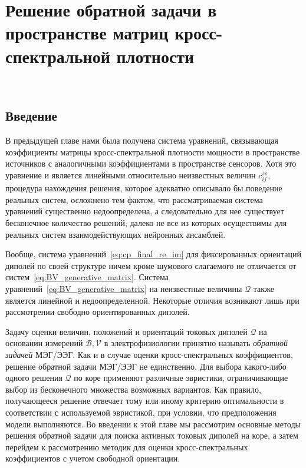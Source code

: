 \chapter{Решение обратной задачи в пространстве матриц кросс-спектральной плотности}~\label{chapt2}


\section{Введение}

В предыдущей главе нами была получена система уравнений, связывающая
коэффициенты матрицы кросс-спектральной плотности мощности в пространстве
источников с аналогичными коэффициентами в пространстве сенсоров. Хотя это
уравнение и является линейными относительно неизвестных величин $c_{ij}^{ss}$,
процедура нахождения решения, которое адекватно описывало бы поведение реальных
систем, осложнено тем фактом, что рассматриваемая система уравнений существенно
недоопределена, а следовательно для нее существует бесконечное количество
решений, далеко не все из которых осуществимы для реальных систем
взаимодействующих нейронных ансамблей.

Вообще, система уравнений~\ref{eq:cp_final_re_im} для фиксированных ориентаций
диполей по своей структуре ничем кроме шумового слагаемого не отличается от
систем~\ref{eq:BV_generative_matrix}.
Система уравнений~\ref{eq:BV_generative_matrix} на неизвестные величины $\mathcal{Q}$ также
является линейной и недоопределенной. Некоторые отличия возникают лишь при
рассмотрении свободно ориентированных диполей.

Задачу оценки величин, положений и ориентаций токовых диполей $\mathcal{Q}$ на
основании измерений $\mathcal{B}, \mathcal{V}$ в электрофизиологии принятно
называть \emph{обратной задачей} МЭГ/ЭЭГ.  Как и в случае оценки
кросс-спектральных коэффициентов, решение обратной задачи МЭГ/ЭЭГ не
единственно.  Для выбора какого-либо одного решения $\mathcal{Q}$ по коре
применяют различные эвристики, ограничивающие выбор из бесконечного множества
возможных вариантов.  Как правило, получающееся решение отвечает тому или иному
критерию оптимальности в соответствии с используемой эвристикой, при условии,
что предположения модели выполняются.  Во введении к этой главе мы рассмотрим
основные методы решения обратной задачи для поиска активных токовых диполей на
коре, а затем перейдем к рассмотрению методик для оценки кросс-спектральных
коэффициентов с учетом свободной ориентации.

